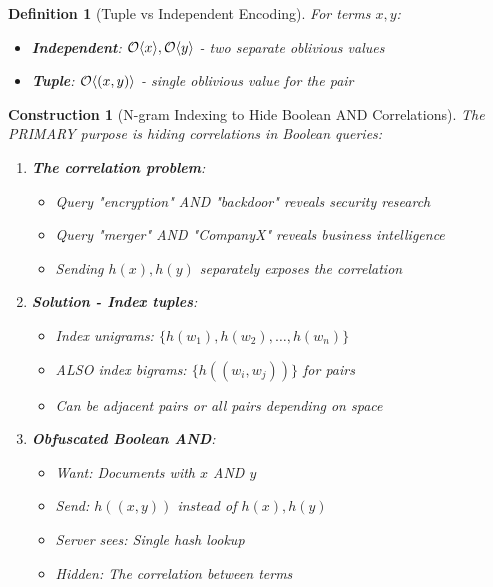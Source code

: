 \documentclass[11pt,final,hidelinks]{article}
\newtheorem{definition}[theorem]{Definition}
\newtheorem{construction}[theorem]{Construction}
\begin{document}
\begin{definition}[Tuple vs Independent Encoding]
For terms $x, y$:
\begin{itemize}
    \item \textbf{Independent}: $\mathcal{O}\langle x \rangle, \mathcal{O}\langle y \rangle$ - two separate oblivious values
    \item \textbf{Tuple}: $\mathcal{O}\langle (x,y) \rangle$ - single oblivious value for the pair
\end{itemize}
\end{definition}

\begin{construction}[N-gram Indexing to Hide Boolean AND Correlations]
The PRIMARY purpose is hiding correlations in Boolean queries:
\begin{enumerate}
    \item \textbf{The correlation problem}:
        \begin{itemize}
            \item Query "encryption" AND "backdoor" reveals security research
            \item Query "merger" AND "CompanyX" reveals business intelligence
            \item Sending $h(x), h(y)$ separately exposes the correlation
        \end{itemize}
    \item \textbf{Solution - Index tuples}:
        \begin{itemize}
            \item Index unigrams: $\{h(w_1), h(w_2), \ldots, h(w_n)\}$
            \item ALSO index bigrams: $\{h((w_i, w_j))\}$ for pairs
            \item Can be adjacent pairs or all pairs depending on space
        \end{itemize}
    \item \textbf{Obfuscated Boolean AND}:
        \begin{itemize}
            \item Want: Documents with $x$ AND $y$
            \item Send: $h((x,y))$ instead of $h(x), h(y)$
            \item Server sees: Single hash lookup
            \item Hidden: The correlation between terms
        \end{itemize}
\end{enumerate}
\end{construction}
\end{document}
